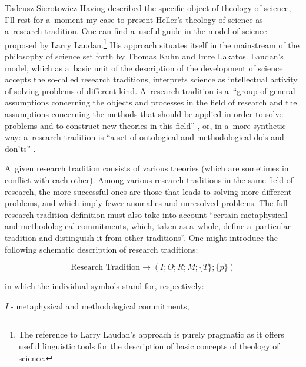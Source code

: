 \begin{artengenv}{Tadeusz Sierotowicz}
Having described the specific object of theology of science, I'll rest for a~moment my case to present Heller's theology of science as a~research tradition. One can find a~useful guide in the model of science proposed by Larry Laudan.\footnote{The reference to Larry Laudan's approach is purely pragmatic as it offers useful linguistic tools for the description of basic concepts of theology of science.} His approach situates itself in the mainstream of the philosophy of science set forth by Thomas Kuhn and Imre Lakatos. Laudan's model, which as a~basic unit of the description of the development of science accepts the so-called research traditions, interprets science as intellectual activity of solving problems of different kind. A~research tradition is a~``group of general assumptions concerning the objects and processes in the field of research and the assumptions concerning the methods that should be applied in order to solve problems and to construct new theories in this field'' 
\parencite[][p.81]{laudan_progress_1977}, %
 or, in a~more synthetic way: a~research tradition is ``a set of ontological and methodological do's and don'ts'' 
\parencite[][pp.79–80]{laudan_progress_1977}.%




A~given research tradition consists of various theories (which are sometimes in conflict with each other). Among various research traditions in the same field of research, the more successful ones are those that leads to solving more different problems, and which imply fewer anomalies and unresolved problems. The full research tradition definition must also take into account ``certain metaphysical and methodological commitments, which, taken as a~whole, define a~particular tradition and distinguish it from other traditions''. One might introduce the following schematic description of research traditions:



$$\textrm{Research Tradition} \to (\textit{I}; \textit{O}; \textit{R}; \textit{M}; \{\textit{T}\}; \{\textit{p}\})$$





in which the individual symbols stand for, respectively:



\textit{I} - metaphysical and methodological commitments,




\end{artengenv}
